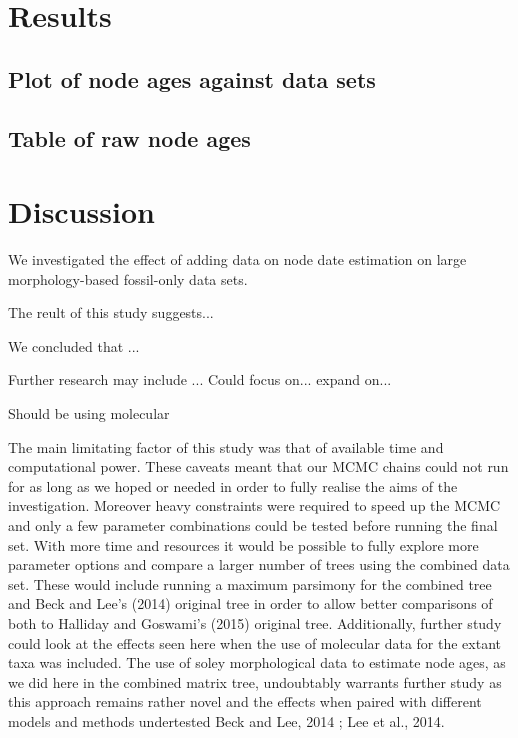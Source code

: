 \documentclass[11pt,letterpaper]{article}
\begin{document}
\newpage

\section{Results} 

\subsection{Plot of node ages against data sets}


\subsection{Table of raw node ages}


\newpage

\section{Discussion}

We investigated the effect of adding data on node date estimation on large morphology-based fossil-only data sets.

The reult of this study suggests...

We concluded that ...

Further research may include ... Could focus on... expand on...

Should be using molecular \citep{puttick2016dating} 

The main limitating factor of this study was that of available time and computational power. These caveats meant that our MCMC chains could not run for as long as we hoped or needed in order to fully realise the aims of the investigation. Moreover heavy constraints were required to speed up the MCMC and only a few parameter combinations could be tested before running the final set. With more time and resources it would be possible to fully explore more parameter options and compare a larger number of trees using the combined data set. These would include running a maximum parsimony for the combined tree and Beck and Lee's (2014) original tree in order to allow better comparisons of both to Halliday and Goswami's (2015) original tree. Additionally, further study could look at the effects seen here when the use of molecular data for the extant taxa was included. The use of soley morphological data to estimate node ages, as we did here in the combined matrix tree, undoubtably warrants further study as this approach remains rather novel and the effects when paired with different models and methods undertested Beck and Lee, 2014 ;  Lee et al., 2014. 
\end{document}
